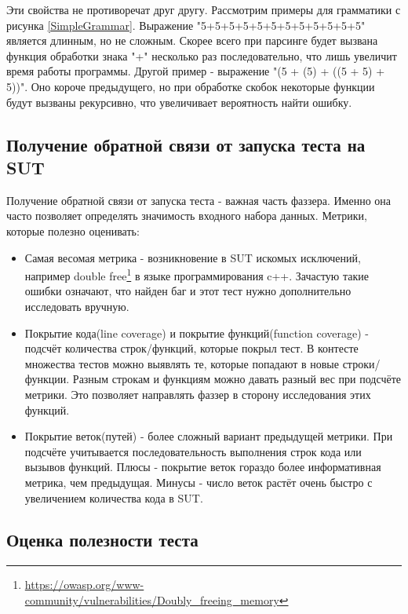 \documentclass[a4paper]{article}
\begin{document}
Эти свойства не противоречат друг другу. Рассмотрим примеры для грамматики с рисунка \ref{SimpleGrammar}. Выражение "5+5+5+5+5+5+5+5+5+5+5+5" является длинным, но не сложным. Скорее всего при парсинге будет вызвана функция обработки знака "+" несколько раз последовательно, что лишь увеличит время работы программы. Другой пример - выражение "(5 + (5) + ((5 + 5) + 5))". Оно короче предыдущего, но при обработке скобок некоторые функции будут вызваны рекурсивно, что увеличивает вероятность найти ошибку.

\subsection{Получение обратной связи от запуска теста на SUT}
\indent

Получение обратной связи от запуска теста - важная часть фаззера. Именно она часто позволяет определять значимость входного набора данных. Метрики, которые полезно оценивать:

\begin{itemize}
\item Самая весомая метрика - возникновение в SUT искомых исключений,
например double free\footnote[1]{\href{https://owasp.org/www-community/vulnerabilities/Doubly\_freeing\_memory}{https://owasp.org/www-community/vulnerabilities/Doubly\_freeing\_memory}} в языке программирования c++. Зачастую такие ошибки означают, что найден баг и этот тест нужно дополнительно исследовать вручную.
\item Покрытие кода(line coverage)\cite{litlink3} и покрытие функций(function coverage)\cite{litlink9} - подсчёт количества строк/функций, которые покрыл тест. В контесте множества тестов можно выявлять те, которые попадают в новые строки/функции. Разным строкам и функциям можно давать разный вес при подсчёте метрики. Это позволяет направлять фаззер в сторону исследования этих функций.
\item Покрытие веток(путей)\cite{litlink9} - более сложный вариант предыдущей метрики. При подсчёте учитывается последовательность выполнения строк кода или вызывов функций. Плюсы - покрытие веток гораздо более информативная метрика, чем предыдущая. Минусы - число веток растёт очень быстро с увеличением количества кода в SUT.
\end{itemize}

\subsection{Оценка полезности теста}
\indent
\end{document}
